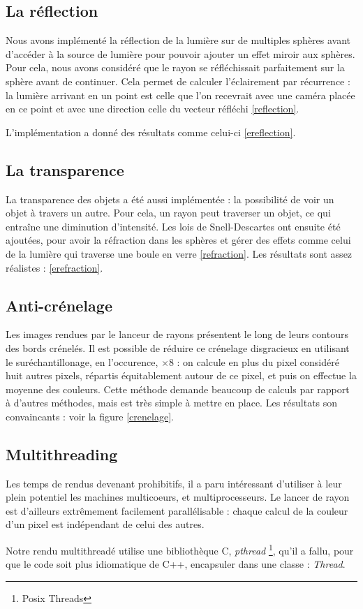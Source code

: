 \subsection{La réflection}
Nous avons implémenté la réflection de la lumière sur de multiples sphères avant d'accéder à la source de lumière pour pouvoir ajouter un effet miroir aux sphères. Pour cela, nous avons considéré que le rayon se réfléchissait parfaitement sur la sphère avant de continuer. Cela permet de calculer l'éclairement par récurrence : la lumière arrivant en un point est celle que l'on recevrait avec une caméra placée en ce point et avec une direction celle du vecteur réfléchi \ref{reflection}.

L'implémentation a donné des résultats comme celui-ci \ref{ereflection}.

\subsection{La transparence}
  La transparence des objets a été aussi implémentée : la possibilité de voir un objet à travers un autre. Pour cela, un rayon peut traverser un objet, ce qui entraîne une diminution d'intensité. Les lois de Snell-Descartes ont ensuite été ajoutées, pour avoir la réfraction dans les sphères et gérer des effets comme celui de la lumière qui traverse une boule en verre \ref{refraction}.
Les résultats sont assez réalistes :  \ref{erefraction}.

\subsection{Anti-crénelage}
  Les images rendues par le lanceur de rayons présentent le long de leurs contours des bords crénelés.
Il est possible de réduire ce crénelage disgracieux en utilisant le suréchantillonage, en l'occurence, $\times 8$ : on calcule en plus 
 du pixel considéré huit autres pixels, répartis équitablement autour de ce pixel, et puis on effectue la moyenne des couleurs.
Cette méthode demande beaucoup de calculs par rapport à d'autres méthodes, mais est très simple à mettre en place.
  Les résultats son convaincants : voir la figure \ref{crenelage}.
 
\subsection{Multithreading}
  Les temps de rendus devenant prohibitifs, il a paru intéressant d'utiliser à leur plein potentiel les machines multicoeurs, et multiprocesseurs.
  Le lancer de rayon est d'ailleurs extrêmement facilement parallélisable : chaque calcul de la couleur d'un pixel est indépendant de celui des 
  autres.
  
  Notre rendu multithreadé utilise une bibliothèque C, \emph{pthread} \footnote{Posix Threads}, qu'il a fallu, pour que le code soit plus idiomatique de C++, 
  encapsuler dans une classe : \emph{Thread}.